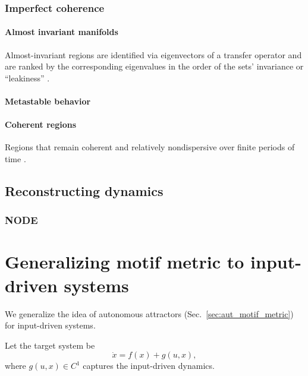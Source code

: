 \documentclass{article}
\theoremstyle{definition} \newtheorem{definition}{Definition}  \newtheorem{example}{Example}
\theoremstyle{remark} \newtheorem{remark}{Remark}
\newcounter{ct}
\begin{document}
\subsubsection{Imperfect coherence}%
\paragraph{Almost invariant manifolds}
 Almost-invariant regions are identified via eigenvectors of a transfer operator and are ranked by the corresponding eigenvalues in the order of the sets' invariance or ``leakiness'' \citep{froyland2009almost}.
    
    
    
\paragraph{Metastable behavior}\label{sec:metastable}
   \citep{brinkman2022metastable}
    
    
\paragraph{Coherent regions}
Regions that remain coherent and relatively nondispersive over finite periods of time \citep{fackeldey2019metastable}.



\subsection{Reconstructing dynamics}\label{sec:rec_dyn}
\subsubsection{NODE}
\citep{finlay2020trainnode}



\newpage

\section{Generalizing motif metric to input-driven systems}
We generalize the idea of autonomous attractors (Sec.~\ref{sec:aut_motif_metric}) for input-driven systems.

Let the target system be
\[
\dot{x} = f(x) + g(u, x),
\]
where \( g(u, x) \in C^1 \) captures the input-driven dynamics.
\end{document}
